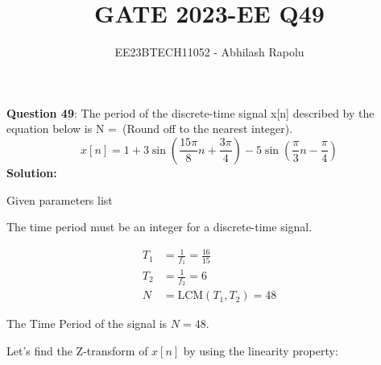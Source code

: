 \documentclass[journal,12pt,twocolumn]{IEEEtran}
\title{GATE 2023-EE Q49}
\author{EE23BTECH11052 - Abhilash Rapolu}
\begin{document}
\maketitle
\newpage
\textbf{Question 49}: The period of the discrete-time signal x[n] described by the equation below is N =\ (Round off to the nearest integer).
$$x[n] = 1 + 3\sin\left(\frac{15\pi}{8}n + \frac{3\pi}{4}\right) - 5\sin\left(\frac{\pi}{3}n - \frac{\pi}{4}\right)$$
\textbf{Solution:}
\begin{table}[htbp]
\centering

\caption{Given parameters list}
\end{table}

The time period must be an integer for a discrete-time signal.

\begin{align}
T_1 &= \frac{1}{f_1} = \frac{16}{15} \\
T_2 &= \frac{1}{f_2} = 6 \\
N &= \text{LCM}(T_1, T_2) = 48
\end{align}

The Time Period of the signal is \(N = 48\).

Let's find the Z-transform of \(x[n]\) by using the linearity property:
\end{document}
